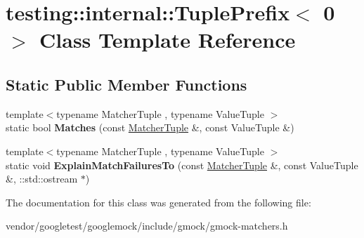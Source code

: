 \hypertarget{classtesting_1_1internal_1_1_tuple_prefix_3_010_01_4}{}\section{testing\+:\+:internal\+:\+:Tuple\+Prefix$<$ 0 $>$ Class Template Reference}
\label{classtesting_1_1internal_1_1_tuple_prefix_3_010_01_4}
\subsection*{Static Public Member Functions}
\begin{DoxyCompactItemize}
\item 
\mbox{\label{classtesting_1_1internal_1_1_tuple_prefix_3_010_01_4_a8bb323da9f209f4fef5d81d7c0b628e9}} 
{\footnotesize template$<$typename Matcher\+Tuple , typename Value\+Tuple $>$ }\\static bool {\bfseries Matches} (const \hyperlink{structtesting_1_1internal_1_1_matcher_tuple}{Matcher\+Tuple} \&, const Value\+Tuple \&)
\item 
\mbox{\label{classtesting_1_1internal_1_1_tuple_prefix_3_010_01_4_aa2980f100d8100e56a0dff1d6df9da57}} 
{\footnotesize template$<$typename Matcher\+Tuple , typename Value\+Tuple $>$ }\\static void {\bfseries Explain\+Match\+Failures\+To} (const \hyperlink{structtesting_1_1internal_1_1_matcher_tuple}{Matcher\+Tuple} \&, const Value\+Tuple \&, \+::std\+::ostream $\ast$)
\end{DoxyCompactItemize}


The documentation for this class was generated from the following file\+:\begin{DoxyCompactItemize}
\item 
vendor/googletest/googlemock/include/gmock/gmock-\/matchers.\+h\end{DoxyCompactItemize}
